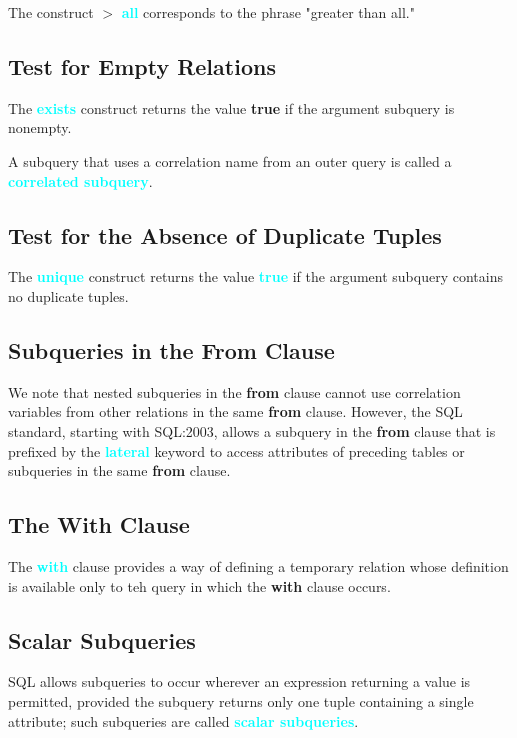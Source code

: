 \documentclass[a4paper,12pt,twoside,openany]{book}
\newcommand{\textcy}[1]{\textbf{\textcolor{cyan}{#1}}}
\begin{document}
The construct $>$ \textcy{all} corresponds to the phrase "greater than all."

\subsection{Test for Empty Relations}

The \textcy{exists} construct returns the value \textbf{true} if the argument subquery is nonempty.

A subquery that uses a correlation name from an outer query is called a \textcy{correlated subquery}.

\subsection{Test for the Absence of Duplicate Tuples}

The \textcy{unique} construct returns the value \textcy{true} if the argument subquery contains no duplicate tuples.

\subsection{Subqueries in the From Clause}

We note that nested subqueries in the \textbf{from} clause cannot use correlation variables from other relations in the same \textbf{from} clause. However, the SQL standard, starting with SQL:2003, allows a subquery in the \textbf{from} clause that is prefixed by the \textcy{lateral} keyword to access attributes of preceding tables or subqueries in the same \textbf{from} clause.

\subsection{The With Clause}

The \textcy{with} clause provides a way of defining a temporary relation whose definition is available only to teh query in which the \textbf{with} clause occurs.

\subsection{Scalar Subqueries}

SQL allows subqueries to occur wherever an expression returning a value is permitted, provided the subquery returns only one tuple containing a single attribute; such subqueries are called \textcy{scalar subqueries}.
\end{document}
